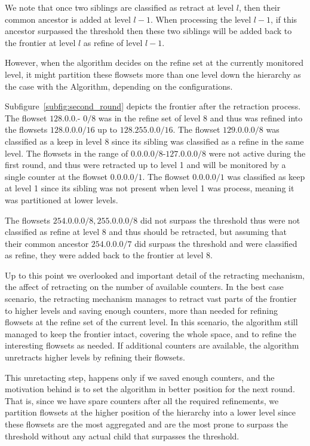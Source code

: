 We note that once  two siblings are classified as retract at level $l$, then their common ancestor is added at level $l-1$. When processing the level $l-1$, if this ancestor surpassed the threshold then these two siblings will be added back to the frontier at level $l$ as refine of level $l-1$.

However, when the algorithm decides on the refine set at the currently monitored level, it might partition these flowsets more than one level down the hierarchy as the case with the \multipleAlgo Algorithm, depending on the configurations.

Subfigure~\ref{subfig:second_round} depicts the frontier after the retraction process. The flowset $128.0.0.$- $0/8$ was in the refine set of level 8 and thus was refined into the flowsets $128.0.0.0/16$ up to $128.255.0.0/16$. The flowset $129.0.0.0/8$ was classified as a keep in level 8 since its sibling was classified as a refine in the same level. The flowsets in the range of $0.0.0.0/8$-$127.0.0.0/8$ were not active during the first round, and thus were retracted up to level 1 and will be monitored by a single counter at the flowset $0.0.0.0/1$. The flowset $0.0.0.0/1$ was classified as keep at level 1 since its sibling was not present when level 1 was process, meaning it was partitioned at lower levels.

The flowsets $254.0.0.0/8, 255.0.0.0/8$ did not surpass the threshold thus were not classified as refine at level 8 and thus should be retracted, but assuming that their common ancestor $254.0.0.0/7$ did surpass the threshold and were classified as refine, they were added back to the frontier at level 8.

Up to this point we overlooked and important detail of the retracting mechanism, the affect of retracting on the number of available counters. In the best case scenario, the retracting mechanism manages to retract vast parts of the frontier to higher levels and saving enough counters, more than needed for refining flowsets at the refine set of the current level. In this scenario, the algorithm still managed to keep the frontier intact, covering the whole space, and to refine the interesting flowsets as needed.
If additional counters are available, the algorithm unretracts higher levels by refining their flowsets.

This unretacting step, happens only if we saved enough counters, and the motivation behind is to set the algorithm in better position for the next round. That is, since we have spare counters after all the required refinements, we partition flowsets at the higher position of the hierarchy into a lower level since these flowsets are the most aggregated and are the most prone to surpass the threshold without any actual child that surpasses the threshold.

